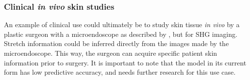 \subsubsection{Clinical \emph{in vivo} skin studies}
An example of clinical use could ultimately be to study skin tissue \emph{in vivo} by a plastic surgeon with a microendoscope as described by \textcite{Kuzmin2016}, but for SHG imaging.
Stretch information could be inferred directly from the images made by the microendoscope.
This way, the surgeon can acquire specific patient skin information prior to surgery.
It is important to note that the model in its current form has low predictive accuracy, and needs further research for this use case.